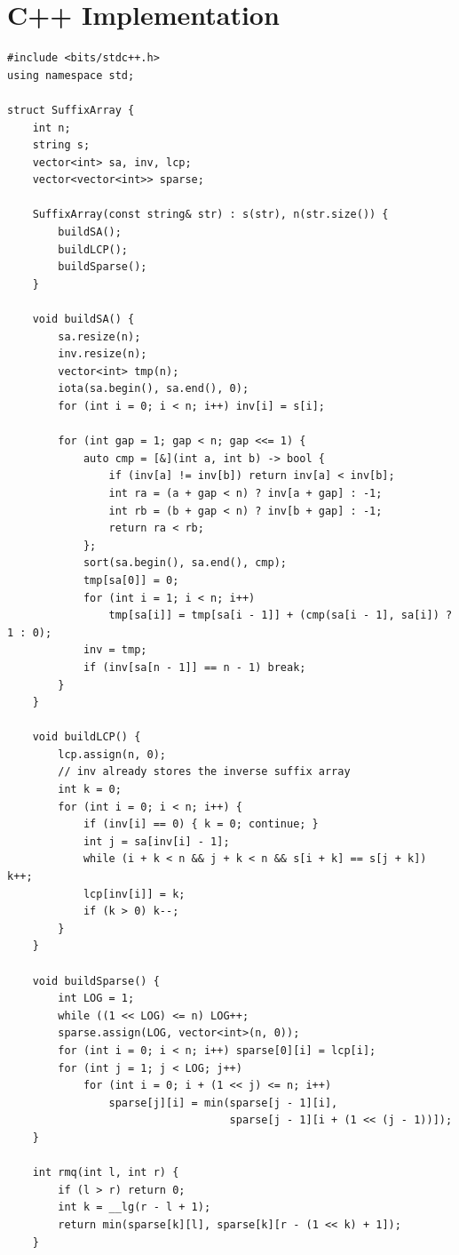 \documentclass[11pt,a4paper]{article}
\begin{document}
\section{C++ Implementation}

\begin{lstlisting}
#include <bits/stdc++.h>
using namespace std;

struct SuffixArray {
    int n;
    string s;
    vector<int> sa, inv, lcp;
    vector<vector<int>> sparse;

    SuffixArray(const string& str) : s(str), n(str.size()) {
        buildSA();
        buildLCP();
        buildSparse();
    }

    void buildSA() {
        sa.resize(n);
        inv.resize(n);
        vector<int> tmp(n);
        iota(sa.begin(), sa.end(), 0);
        for (int i = 0; i < n; i++) inv[i] = s[i];

        for (int gap = 1; gap < n; gap <<= 1) {
            auto cmp = [&](int a, int b) -> bool {
                if (inv[a] != inv[b]) return inv[a] < inv[b];
                int ra = (a + gap < n) ? inv[a + gap] : -1;
                int rb = (b + gap < n) ? inv[b + gap] : -1;
                return ra < rb;
            };
            sort(sa.begin(), sa.end(), cmp);
            tmp[sa[0]] = 0;
            for (int i = 1; i < n; i++)
                tmp[sa[i]] = tmp[sa[i - 1]] + (cmp(sa[i - 1], sa[i]) ? 1 : 0);
            inv = tmp;
            if (inv[sa[n - 1]] == n - 1) break;
        }
    }

    void buildLCP() {
        lcp.assign(n, 0);
        // inv already stores the inverse suffix array
        int k = 0;
        for (int i = 0; i < n; i++) {
            if (inv[i] == 0) { k = 0; continue; }
            int j = sa[inv[i] - 1];
            while (i + k < n && j + k < n && s[i + k] == s[j + k]) k++;
            lcp[inv[i]] = k;
            if (k > 0) k--;
        }
    }

    void buildSparse() {
        int LOG = 1;
        while ((1 << LOG) <= n) LOG++;
        sparse.assign(LOG, vector<int>(n, 0));
        for (int i = 0; i < n; i++) sparse[0][i] = lcp[i];
        for (int j = 1; j < LOG; j++)
            for (int i = 0; i + (1 << j) <= n; i++)
                sparse[j][i] = min(sparse[j - 1][i],
                                   sparse[j - 1][i + (1 << (j - 1))]);
    }

    int rmq(int l, int r) {
        if (l > r) return 0;
        int k = __lg(r - l + 1);
        return min(sparse[k][l], sparse[k][r - (1 << k) + 1]);
    }


\end{lstlisting}
\end{document}
